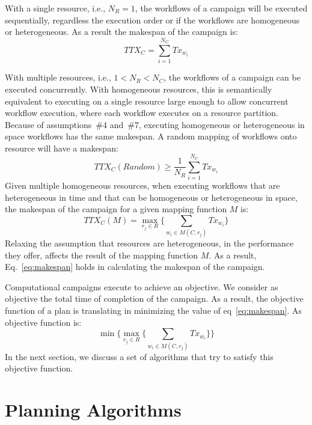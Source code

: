 With a single resource, i.e., $N_{R} = 1$, the workflows of a campaign will be executed sequentially, regardless the execution order or if the workflows are homogeneous or heterogeneous.
As a result the makespan of the campaign is:
\begin{equation}
   TTX_{C} = \sum_{i=1}^{N_{C}}Tx_{w_{i}} 
\end{equation}

With multiple resources, i.e., $1 < N_{R} < N_{C}$, the workflows of a campaign can be executed concurrently.
With homogeneous resources, this is semantically equivalent to executing on a single resource large enough to allow concurrent workflow execution, where each workflow executes on a resource partition. 
Because of assumptions~\#4 and~\#7, executing homogeneous or heterogeneous in space workflows has the same makespan.
A random mapping of workflows onto resource will have a makespan:
\begin{equation}
   TTX_{C}(Random) \geq \frac{1}{N_{R}}\sum_{i=1}^{N_{C}} Tx_{w_{i}} 
\end{equation}
Given multiple homogeneous resources, when executing workflows that are heterogeneous in time and that can be homogeneous or heterogeneous in space, the makespan of the campaign for a given mapping function $ M $ is:
\begin{equation}
TTX_{C}(M) = \max_{r_{j}\in R}\Big\{\sum_{w_{i}\in M(C,r_{j})}Tx_{w_{i}}\Big\}
\label{eq:makespan}
\end{equation}
Relaxing the assumption that resources are heterogeneous, in the performance they offer, affects the result of the mapping function $ M $.
As a result, Eq.~\ref{eq:makespan} holds in calculating the makespan of the campaign.

Computational campaigns execute to achieve an objective.
We consider as objective the total time of completion of the campaign.
As a result, the objective function of a plan is translating in minimizing the value of eq~\ref{eq:makespan}.
As objective function is:
\begin{equation}
    \min\Big\{\max_{r_{j}\in R}\Big\{\sum_{w_{i}\in M(C,r_{j})}Tx_{w_{i}}\Big\}\Big\}
\end{equation}
In the next section, we discuss a set of algorithms that try to satisfy this objective function.

\section{Planning Algorithms}
\label{sec:algo}


